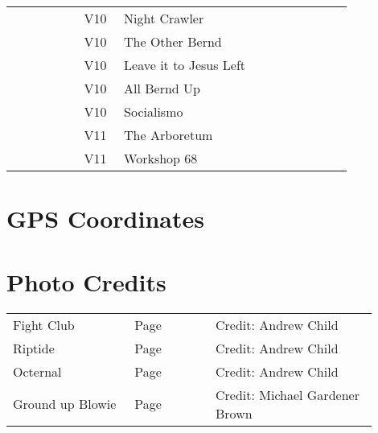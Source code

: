 \begin{flushleft}
\begin{center}
\begin{supertabular}{p{0.18\linewidth}p{0.08\linewidth}p{0.5\linewidth}p{0.08\linewidth}}
  &V10&Night Crawler & \pageref{rt:Night Crawler} \\
&V10&The Other Bernd & \pageref{rt:The Other Bernd} \\
&V10&Leave it to Jesus Left & \pageref{vr:Leave it to Jesus Left} \\
&V10&All Bernd Up & \pageref{rt:All Bernd Up} \\
&V10&Socialismo & \pageref{rt:Socialismo} \\
   &V11&The Arboretum & \pageref{rt:The Arboretum} \\
&V11&Workshop 68 & \pageref{rt:Workshop 68} \\
\end{supertabular}
\end{center}
\section{GPS Coordinates}
\section{Photo Credits}
\begin{supertabular}{p{0.3\linewidth}p{0.2\linewidth}p{0.4\linewidth}}
Fight Club&Page \pageref{pt:Fight Club}&Credit: Andrew Child\\
Riptide&Page \pageref{pt:Riptide}&Credit: Andrew Child\\
Octernal&Page \pageref{pt:Octernal}&Credit: Andrew Child\\
Ground up Blowie&Page \pageref{pt:Ground up Blowie}&Credit: Michael Gardener Brown\\
\end{supertabular}
\end{flushleft}
\onecolumn
\clearpage